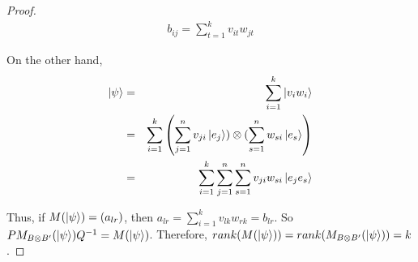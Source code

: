 \begin{proof}
\begin{comment}
=\begin{pmatrix}
\ket{v_1} && \ket{v_2} && \hdots && \ket{v_n}
\end{pmatrix}
\begin{pmatrix}
\text{---} && \ket{w_1}^T &&\text{---} \\
\text{---} && \ket{w_2}^T &&\text{---} \\
\vdots && \vdots && \vdots \\
\text{---} && \ket{w_k}^T &&\text{---} \\
\text{---} && 0 &&\text{---}
\end{pmatrix}\\
=\begin{pmatrix}
v_{11}w_{11}+\hdots+v_{1k}w_{1k} && v_{11}w_{21}+\hdots+v_{1k}w_{2k} && \hdots && v_{11}w_{n1}+\hdots+v_{1k}w_{nk}\\
v_{21}w_{11}+\hdots+v_{2k}w_{1k} && v_{21}w_{21}+\hdots+v_{2k}w_{2k} && \hdots && v_{21}w_{n1}+\hdots+v_{2k}w_{nk}\\
\vdots && \vdots && \vdots && \vdots\\
v_{n1}w_{11}+\hdots+v_{nk}w_{1k} && v_{n1}w_{21}+\hdots+v_{nk}w_{2k} && \hdots && v_{n1}w_{n1}+\hdots+v_{nk}w_{nk}
\end{pmatrix}

\end{comment}
\begin{gather*}
    b_{ij}=\sum_{t=1}^k v_{it}w_{jt}
\end{gather*}


On the other hand,
\begin{eqnarray*}
\ket{\psi}&=&\sum_{i=1}^k \ket{v_i w_i}\\
&=&\sum_{i=1}^k \left(\sum_{j=1}^{n} v_{ji} \ket{e_j}) \otimes (\sum_{s=1}^n w_{si}\ket{e_s}\right)\\
&=&\sum_{i=1}^k \sum_{j=1}^{n} \sum_{s=1}^n v_{ji} w_{si} \ket{e_j e_s}\\
\end{eqnarray*}

\noindent
Thus, if $M(\ket{\psi})=(a_{lr})$, then $a_{lr}=\sum_{i=1}^k v_{lk} w_{rk}=b_{lr}$.
So $PM_{B \otimes B'}(\ket{\psi})Q^{-1}=M(\ket{\psi})$.  Therefore, $rank(M(\ket{\psi}))=rank(M_{B \otimes B'}(\ket{\psi}))=k$.
\end{proof}

